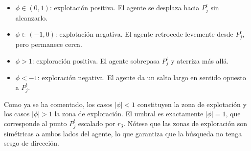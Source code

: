 \documentclass[12pt,a4paper]{article}
\begin{document}
\begin{itemize}
  \item $\phi \in (0,1)$: explotación positiva. El agente se desplaza hacia $P_j^t$ sin alcanzarlo.
  \item $\phi \in (-1,0)$: explotación negativa. El agente retrocede levemente desde $P_j^t$, pero permanece cerca.
  \item $\phi > 1$: exploración positiva. El agente sobrepasa $P_j^t$ y aterriza más allá.
  \item $\phi < -1$: exploración negativa. El agente da un salto largo en sentido opuesto a $P_j^t$.
\end{itemize}

Como ya se ha comentado, los casos $|\phi| < 1$ constituyen la zona de explotación y los casos $|\phi| > 1$ la zona de exploración. El umbral es exactamente $|\phi| = 1$, que corresponde al punto $P_j^t$ escalado por $r_3$. Nótese que las zonas de exploración son simétricas a ambos lados del agente, lo que garantiza que la búsqueda no tenga sesgo de dirección.
\end{document}

